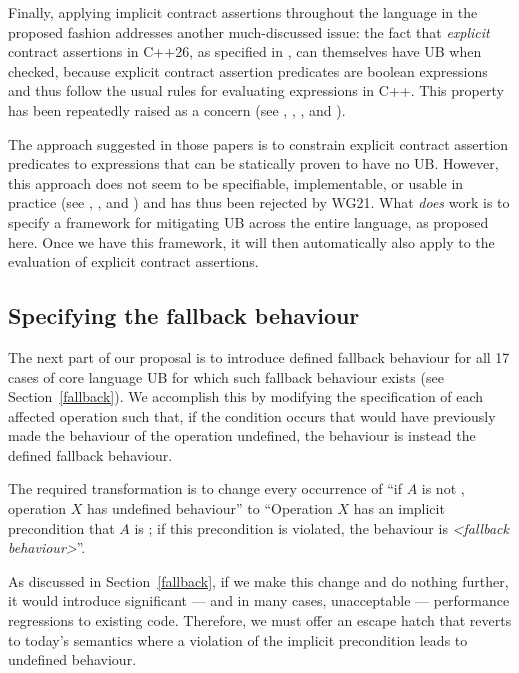 Finally, applying implicit contract assertions throughout the language in the proposed fashion addresses another much-discussed issue: the fact that \emph{explicit} contract assertions in C++26, as specified in \cite{P2900R14}, can themselves have UB when checked, because explicit contract assertion predicates are boolean expressions and thus follow the usual rules for evaluating expressions in C++. This property has been repeatedly raised as a concern (see \cite{P2680R1}, \cite{P3173R0}, \cite{P3285R0}, and \cite{P3362R0}).

The approach suggested in those papers is to constrain explicit contract assertion predicates to expressions that can be statically proven to have no UB. However, this approach does not seem to be specifiable, implementable, or usable in practice (see  \cite{P3376R0}, \cite{P3386R0}, and \cite{P3499R1}) and has thus been rejected by WG21. What \emph{does} work is to specify a framework for mitigating UB across the entire language, as proposed here. Once we have this framework, it will then automatically also apply to the evaluation of explicit contract assertions.

\subsection{Specifying the fallback behaviour}
\label{specifyfallback}

The next part of our proposal is to introduce defined fallback behaviour for all 17 cases of core language UB for which such fallback behaviour exists (see Section~\ref{fallback}). We accomplish this by modifying the specification of each affected operation such that, if the condition occurs that would have previously made the behaviour of the operation undefined, the behaviour is instead the defined fallback behaviour.

The required transformation is to change every occurrence of “if $A$ is not , operation $X$ has undefined behaviour'' to ``Operation $X$ has an implicit precondition that $A$ is ; if this precondition is violated, the behaviour is \emph{<fallback behaviour>}''.

As discussed in Section~\ref{fallback}, if we make this change and do nothing further, it would introduce significant --- and in many cases, unacceptable --- performance regressions to existing code. Therefore, we must offer an escape hatch that reverts to today's semantics where a violation of the implicit precondition leads to undefined behaviour.


